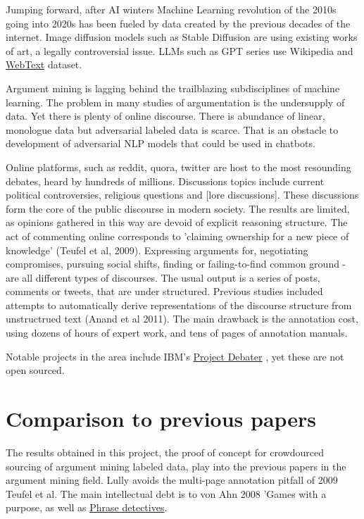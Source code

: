 \documentclass{article}
\begin{document}
Jumping forward, after AI winters Machine Learning revolution of the 2010s going into 2020s has been fueled by data created by the previous decades of the internet. Image diffusion models such as Stable Diffusion are using existing works of art, a legally controversial issue. LLMs such as GPT series use Wikipedia and \href{https://paperswithcode.com/dataset/webtext}{WebText} dataset.

Argument mining is lagging behind the trailblazing subdisciplines of machine learning. The problem in many studies of argumentation is the undersupply of data. Yet there is plenty of online discourse.
There is abundance of linear, monologue data but adversarial labeled data is scarce. That is an obstacle to development of adversarial NLP models that could be used in chatbots. 

Online platforms, such as reddit, quora, twitter are host to the most resounding debates, heard by hundreds of millions.  Discussions topics include current political controversies, religious questions and [lore discussions]. These discussions form the core of the public discourse in modern society.  The results are limited, as opinions gathered in this way are devoid of explicit reasoning structure.  The act of commenting online corresponds to 'claiming ownership for a new piece of knowledge' (Teufel et al, 2009). Expressing arguments for, negotiating compromises, pursuing social shifts, finding or failing-to-find common ground - are all different types of discourses. The usual output is a series of posts, comments or tweets, that are under structured. 
Previous studies included attempts to automatically derive representations of the discourse structure from unstructrued text (Anand et al 2011).
The main drawback is the annotation cost, using dozens of hours of expert work, and tens of pages of annotation manuals.

Notable projects in the area include IBM's \href{https://research.ibm.com/interactive/project-debater/}{Project Debater} \cite{slonim2021autonomous}, yet these are not open sourced.

\section{Comparison to previous papers}
The results obtained in this project, the proof of concept for crowdourced sourcing of argument mining labeled data, play into the previous papers in the argument mining field.
Lully avoids the multi-page annotation pitfall of 2009 Teufel et al.
The main intellectual debt is to von Ahn 2008 'Games with a purpose, as well as \href{https://dl.acm.org/doi/10.1145/2448116.2448119}{Phrase detectives}.
\end{document}
